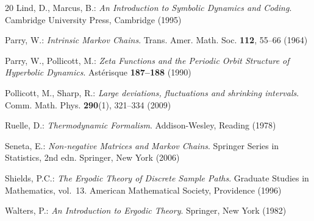 \documentclass[pdflatex,sn-basic,Numbered]{sn-jnl}
\theoremstyle{thmstyleone}
\theoremstyle{thmstyletwo}
\theoremstyle{thmstylethree}
\begin{document}
\begin{thebibliography}{20}
Lind, D., Marcus, B.:
\textit{An Introduction to Symbolic Dynamics and Coding}.
Cambridge University Press, Cambridge (1995)

Parry, W.:
\textit{Intrinsic Markov Chains}.
Trans. Amer. Math. Soc. \textbf{112}, 55--66 (1964)

Parry, W., Pollicott, M.:
\textit{Zeta Functions and the Periodic Orbit Structure of Hyperbolic Dynamics}.
Ast\'erisque \textbf{187--188} (1990)

Pollicott, M., Sharp, R.:
\textit{Large deviations, fluctuations and shrinking intervals}.
Comm. Math. Phys. \textbf{290}(1), 321--334 (2009)

Ruelle, D.:
\textit{Thermodynamic Formalism}.
Addison-Wesley, Reading (1978)

Seneta, E.:
\textit{Non-negative Matrices and Markov Chains}.
Springer Series in Statistics, 2nd edn.
Springer, New York (2006)

Shields, P.C.:
\textit{The Ergodic Theory of Discrete Sample Paths}.
Graduate Studies in Mathematics, vol.~13.
American Mathematical Society, Providence (1996)

Walters, P.:
\textit{An Introduction to Ergodic Theory}.
Springer, New York (1982)

\end{thebibliography}
\end{document}
